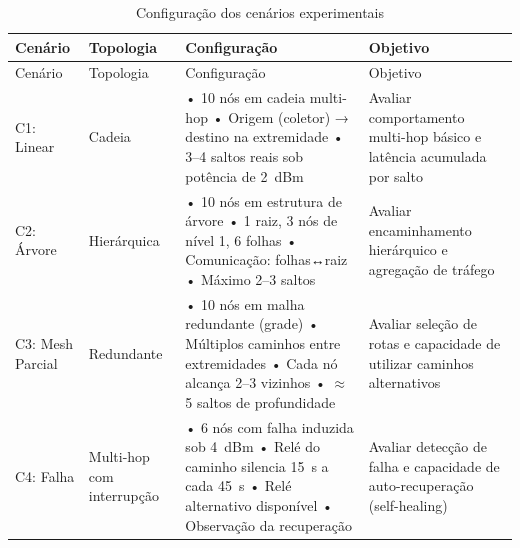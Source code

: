 {\def\LTcaptype{quadro}
\begin{longtable}[]{@{}
  >{\raggedright\arraybackslash}p{}
  >{\raggedright\arraybackslash}p{}
  >{\raggedright\arraybackslash}p{}
  >{\raggedright\arraybackslash}p{}@{}}
\caption{Configuração dos cenários experimentais}\label{quadro:cenarios}\\
\toprule\noalign{}
\begin{minipage}[b]{\linewidth}\raggedright
Cenário
\end{minipage} & \begin{minipage}[b]{\linewidth}\raggedright
Topologia
\end{minipage} & \begin{minipage}[b]{\linewidth}\raggedright
Configuração
\end{minipage} & \begin{minipage}[b]{\linewidth}\raggedright
Objetivo
\end{minipage} \\
\midrule\noalign{}
\endfirsthead
\toprule\noalign{}
\begin{minipage}[b]{\linewidth}\raggedright
Cenário
\end{minipage} & \begin{minipage}[b]{\linewidth}\raggedright
Topologia
\end{minipage} & \begin{minipage}[b]{\linewidth}\raggedright
Configuração
\end{minipage} & \begin{minipage}[b]{\linewidth}\raggedright
Objetivo
\end{minipage} \\
\midrule\noalign{}
\endhead
\bottomrule\noalign{}
\endlastfoot
C1: Linear & Cadeia & • 10 nós em cadeia multi-hop • Origem (coletor) →
destino na extremidade • 3--4 saltos reais sob potência de 2~dBm &
Avaliar comportamento multi-hop básico e latência acumulada por salto \\
C2: Árvore & Hierárquica & • 10 nós em estrutura de árvore • 1 raiz, 3
nós de nível 1, 6 folhas • Comunicação: folhas↔raiz • Máximo 2--3 saltos &
Avaliar encaminhamento hierárquico e agregação de tráfego \\
C3: Mesh Parcial & Redundante & • 10 nós em malha redundante (grade) •
Múltiplos caminhos entre extremidades • Cada nó alcança 2--3 vizinhos •
$\approx$5 saltos de profundidade &
Avaliar seleção de rotas e capacidade de utilizar caminhos
alternativos \\
C4: Falha & Multi-hop com interrupção & • 6 nós com falha induzida sob
4~dBm • Relé do caminho silencia 15~s a cada 45~s • Relé alternativo
disponível • Observação da recuperação & Avaliar detecção de falha e capacidade de
auto-recuperação (self-healing) \\
\end{longtable}
}

